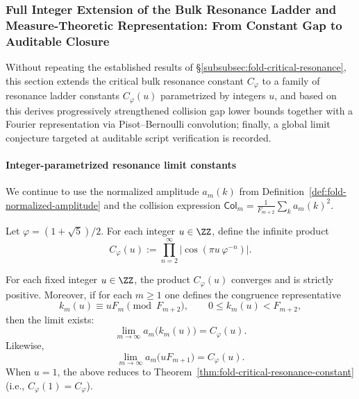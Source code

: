 \subsubsection{Full Integer Extension of the Bulk Resonance Ladder and Measure-Theoretic Representation: From Constant Gap to Auditable Closure}\label{subsubsec:fold-bulk-resonance-integer-ladder}
Without repeating the established results of \S\ref{subsubsec:fold-critical-resonance},
this section extends the critical bulk resonance constant \(C_\varphi\) to a family of resonance ladder constants \(C_\varphi(u)\) parametrized by integers \(u\),
and based on this derives progressively strengthened collision gap lower bounds together with a Fourier representation via Pisot--Bernoulli convolution;
finally, a global limit conjecture targeted at auditable script verification is recorded.

\paragraph{Integer-parametrized resonance limit constants}
We continue to use the normalized amplitude \(a_m(k)\) from Definition~\ref{def:fold-normalized-amplitude} and the collision expression
\(
\mathsf{Col}_m=\frac{1}{F_{m+2}}\sum_{k}a_m(k)^2
\).

\begin{definition}\label{def:fold-critical-resonance-ladder}
Let \(\varphi=(1+\sqrt 5)/2\).
For each integer \(u\in\ZZ\), define the infinite product
\[
C_\varphi(u):=\prod_{n=2}^{\infty}\bigl|\cos(\pi u\,\varphi^{-n})\bigr|.
\]
\end{definition}

\begin{theorem}\label{thm:fold-critical-resonance-constant-integer-ladder}
For each fixed integer \(u\in\ZZ\), the product \(C_\varphi(u)\) converges and is strictly positive.
Moreover, if for each \(m\ge 1\) one defines the congruence representative
\[
k_m(u)\equiv uF_m\pmod{F_{m+2}},
\qquad 0\le k_m(u)<F_{m+2},
\]
then the limit exists:
\[
\lim_{m\to\infty}a_m\!\bigl(k_m(u)\bigr)=C_\varphi(u).
\]
Likewise,
\[
\lim_{m\to\infty}a_m\!\bigl(uF_{m+1}\bigr)=C_\varphi(u).
\]
When \(u=1\), the above reduces to Theorem~\ref{thm:fold-critical-resonance-constant} (i.e., \(C_\varphi(1)=C_\varphi\)).
\end{theorem}

